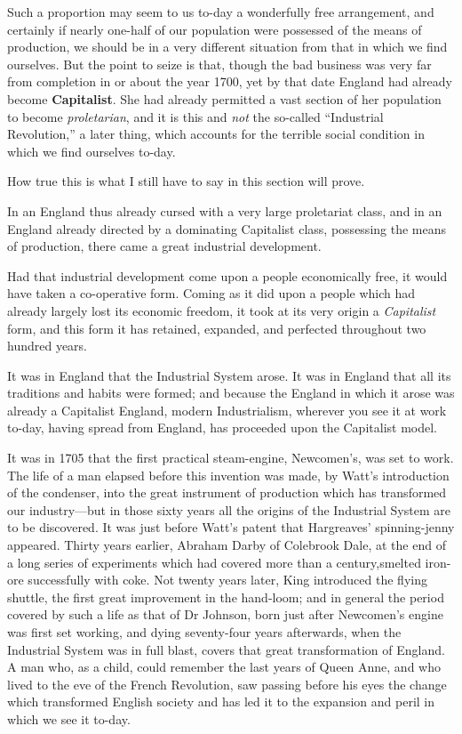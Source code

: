 \documentclass{book}
\begin{document}
Such a proportion may seem to us to-day a wonderfully free arrangement, and certainly if nearly one-half of our population were possessed of the means of production, we should be in a very different situation from that in which we find ourselves. But the point to seize is that, though the bad business was very far from completion in or about the year 1700, yet by that date England had already become \textbf{Capitalist}. She had already permitted a vast section of her population to become \emph{proletarian}, and it is this and \emph{not} the so-called “Industrial Revolution,” a later thing, which accounts for the terrible social condition in which we find ourselves to-day.

How true this is what I still have to say in this section will prove.

In an England thus already cursed with a very large proletariat class, and in an England already directed by a dominating Capitalist class, possessing the means of production, there came a great industrial development.

Had that industrial development come upon a people economically free, it would have taken a co-operative form. Coming as it did upon a people which had already largely lost its economic freedom, it took at its very origin a \emph{Capitalist} form, and this form it has retained, expanded, and perfected throughout two hundred years.

It was in England that the Industrial System arose. It was in England that all its traditions and habits were formed; and because the England in which it arose was already a Capitalist England, modern Industrialism, wherever you see it at work to-day, having spread from England, has proceeded upon the Capitalist model.

It was in 1705 that the first practical steam-engine, Newcomen’s, was set to work. The life of a man elapsed before this invention was made, by Watt’s introduction of the condenser, into the great instrument of production which has transformed our industry—but in those sixty years all the origins of the Industrial System are to be discovered. It was just before Watt’s patent that Hargreaves’ spinning-jenny appeared. Thirty years earlier, Abraham Darby of Colebrook Dale, at the end of a long series of experiments which had covered more than a century,smelted iron-ore successfully with coke. Not twenty years later, King introduced the flying shuttle, the first great improvement in the hand-loom; and in general the period covered by such a life as that of Dr Johnson, born just after Newcomen’s engine was first set working, and dying seventy-four years afterwards, when the Industrial System was in full blast, covers that great transformation of England. A man who, as a child, could remember the last years of Queen Anne, and who lived to the eve of the French Revolution, saw passing before his eyes the change which transformed English society and has led it to the expansion and peril in which we see it to-day.
\end{document}
